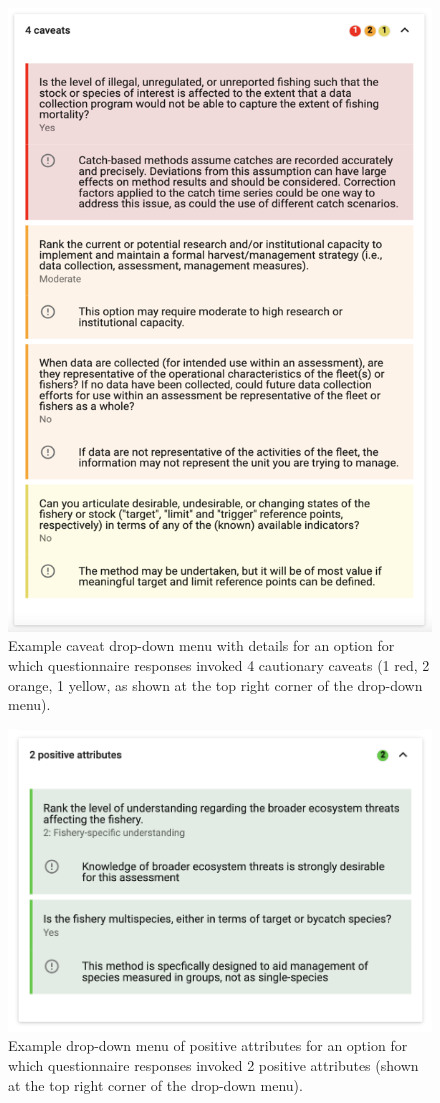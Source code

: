 \documentclass[
  11pt,
]{book}
\begin{document}
\begin{figure}

{\centering \includegraphics[width=0.75\linewidth]{images/cav-drop-down} 

}

\caption{Example caveat drop-down menu with details for an option for which questionnaire responses invoked 4 cautionary caveats (1 red, 2 orange, 1 yellow, as shown at the top right corner of the drop-down menu).}\label{fig:cav-drop-down}
\end{figure}

\begin{figure}

{\centering \includegraphics[width=0.75\linewidth]{images/pos-attr-drop-down} 

}

\caption{Example drop-down menu of positive attributes for an option for which questionnaire responses invoked 2 positive attributes (shown at the top right corner of the drop-down menu).}\label{fig:pos-attr-drop-down}
\end{figure}
\end{document}
